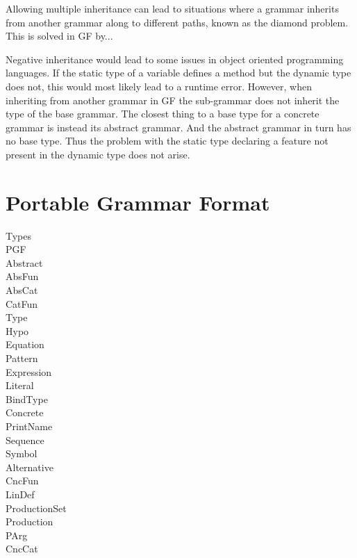 Allowing multiple inheritance can lead to situations where a grammar inherits from another grammar along to different paths, known as the diamond problem. This is solved in GF by...

Negative inheritance would lead to some issues in object oriented programming languages. If the static type of a variable defines a method but the dynamic type does not, this would most likely lead to a runtime error. However, when inheriting from another grammar in GF the sub-grammar does not inherit the type of the base grammar. The closest thing to a base type for a concrete grammar is instead its abstract grammar. And the abstract grammar in turn has no base type. Thus the problem with the static type declaring a feature not present in the dynamic type does not arise.

\section{Portable Grammar Format}
\begin{description}
\item[Types]
\item[PGF]
\item[Abstract]
\item[AbsFun]
\item[AbsCat]
\item[CatFun]
\item[Type]
\item[Hypo]
\item[Equation]
\item[Pattern]
\item[Expression]
\item[Literal]
\item[BindType]
\item[Concrete]
\item[PrintName]
\item[Sequence]
\item[Symbol]
\item[Alternative]
\item[CncFun]
\item[LinDef]
\item[ProductionSet]
\item[Production]
\item[PArg]
\item[CncCat]
\end{description}
